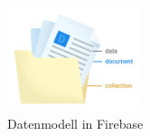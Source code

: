 \begin{figure}
	\begin{center}
		\includegraphics[width=0.35\textwidth]{./Theoretische_Grundlagen/images/firestore_datastucture.png}
	\end{center}
	\caption{Datenmodell in Firebase \protect \footnotemark}
	\label{fig:firestore_data_structure}
\end{figure}


